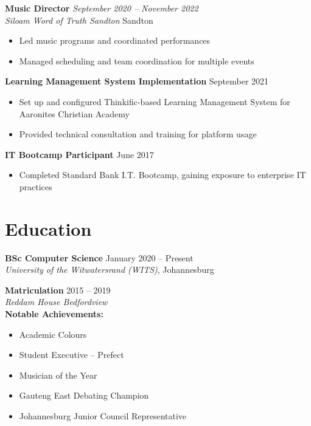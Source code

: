 \documentclass[11pt,a4paper]{article}
\newcommand{\cvitem}[4]{
  \textbf{#1} \hfill \textit{#2} \\
  \textit{#3} \hfill #4 \\[0.2em]
}
\newcommand{\cventry}[2]{
  \textbf{#1} \hfill #2 \\
}
\begin{document}
\vspace{0.5em}

\cvitem{Music Director}{September 2020 -- November 2022}{Siloam Word of Truth Sandton}{Sandton}
\begin{itemize}[leftmargin=*, itemsep=0pt]
    \item Led music programs and coordinated performances
    \item Managed scheduling and team coordination for multiple events
\end{itemize}

\vspace{0.5em}

\cventry{Learning Management System Implementation}{September 2021}
\begin{itemize}[leftmargin=*, itemsep=0pt]
    \item Set up and configured Thinkific-based Learning Management System for Aaronites Christian Academy
    \item Provided technical consultation and training for platform usage
\end{itemize}

\vspace{0.5em}

\cventry{IT Bootcamp Participant}{June 2017}
\begin{itemize}[leftmargin=*, itemsep=0pt]
    \item Completed Standard Bank I.T. Bootcamp, gaining exposure to enterprise IT practices
\end{itemize}

\section*{Education}

\cventry{BSc Computer Science}{January 2020 -- Present}
\textit{University of the Witwatersrand (WITS)}, Johannesburg

\vspace{0.5em}

\cventry{Matriculation}{2015 -- 2019}
\textit{Reddam House Bedfordview} \\[0.2em]
\textbf{Notable Achievements:}
\begin{itemize}[leftmargin=*, itemsep=0pt]
    \item Academic Colours
    \item Student Executive -- Prefect
    \item Musician of the Year
    \item Gauteng East Debating Champion
    \item Johannesburg Junior Council Representative
\end{itemize}
\end{document}
